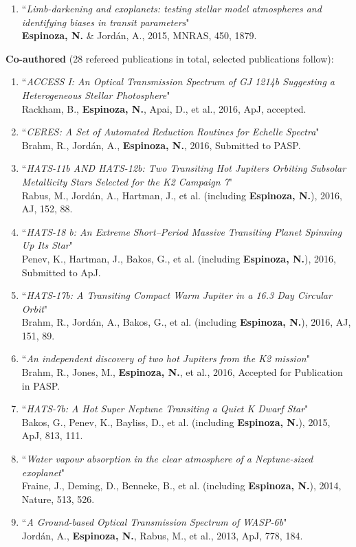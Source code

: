 \documentclass[11pt, a4paper]{article} %
\begin{document}
\begin{flushleft}
\begin{enumerate}
\item ``\textit{Limb-darkening and exoplanets: testing stellar model atmospheres and identifying biases in transit parameters}"\\
         \textbf{Espinoza, N.} \& Jord\'an, A., 2015, MNRAS, 450, 1879. 
\end{enumerate}
\textbf{Co-authored} (28 refereed publications in total, selected publications follow):
\begin{enumerate}
\setlength\itemsep{0.05cm}
\item ``\textit{ACCESS I: An Optical Transmission Spectrum of GJ 1214b Suggesting a Heterogeneous Stellar Photosphere}"\\
          Rackham, B., \textbf{Espinoza, N.}, Apai, D., et al., 2016, ApJ, accepted.
\item ``\textit{CERES: A Set of Automated Reduction Routines for Echelle Spectra}"\\
          Brahm, R., Jord\'an, A., \textbf{Espinoza, N.}, 2016, Submitted to PASP.
\item ``\textit{HATS-11b AND HATS-12b: Two Transiting Hot Jupiters Orbiting Subsolar Metallicity Stars Selected for the K2 Campaign 7}"\\
          Rabus, M., Jord\'an, A., Hartman, J., et al. (including \textbf{Espinoza, N.}), 2016, AJ, 152, 88.
\item ``\textit{HATS-18 b: An Extreme Short--Period Massive Transiting Planet Spinning Up Its Star}"\\
          Penev, K., Hartman, J., Bakos, G., et al. (including \textbf{Espinoza, N.}), 2016, Submitted to ApJ.
\item ``\textit{HATS-17b: A Transiting Compact Warm Jupiter in a 16.3 Day Circular Orbit}"\\
          Brahm, R., Jord\'an, A., Bakos, G., et al. (including \textbf{Espinoza, N.}), 2016, AJ, 151, 89.
\item ``\textit{An independent discovery of two hot Jupiters from the K2 mission}"\\
          Brahm, R., Jones, M., \textbf{Espinoza, N.}, et al., 2016, Accepted for Publication in PASP.
\item ``\textit{HATS-7b: A Hot Super Neptune Transiting a Quiet K Dwarf Star}"\\
          Bakos, G., Penev, K., Bayliss, D., et al. (including \textbf{Espinoza, N.}), 2015, ApJ, 813, 111.
\item ``\textit{Water vapour absorption in the clear atmosphere of a Neptune-sized exoplanet}"\\
          Fraine, J., Deming, D., Benneke, B., et al. (including \textbf{Espinoza, N.}), 2014, Nature, 513, 526.
\item ``\textit{A Ground-based Optical Transmission Spectrum of WASP-6b}"\\
          Jord\'an, A., \textbf{Espinoza, N.}, Rabus, M., et al., 2013, ApJ, 778, 184.
\end{enumerate}
\end{flushleft}
\end{document}
